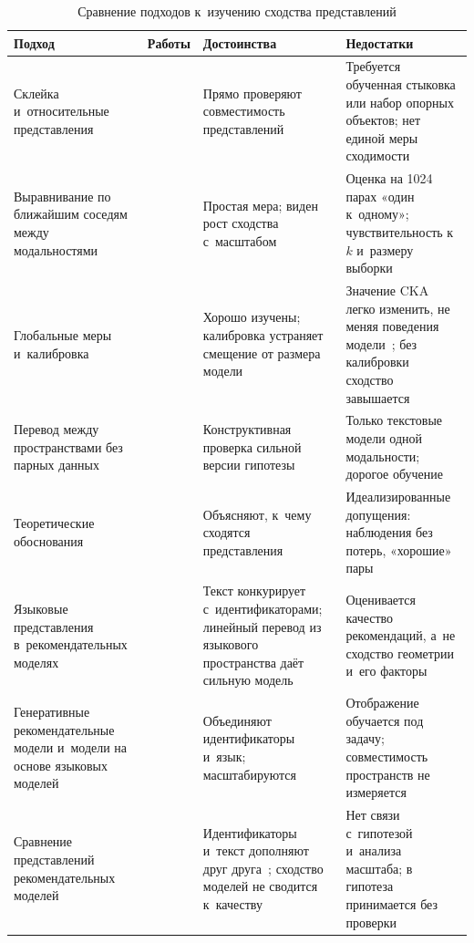 \documentclass[a4paper,12pt]{article}
\begin{document}
\begin{table}[!htbp]
\caption{Сравнение подходов к~изучению сходства представлений}
\label{tab:review}
\small
\renewcommand{\arraystretch}{1.15}
\begin{tabularx}{\textwidth}{@{}P{3.7cm}P{1.6cm}LL@{}}
\toprule
Подход & Работы & Достоинства & Недостатки \\
\midrule
Склейка и~относительные представления
  & \cite{moschella2023relative,bansal2021stitching,dravid2023rosetta,lenc2015equivariance}
  & Прямо проверяют совместимость представлений
  & Требуется обученная стыковка или набор опорных объектов; нет единой меры сходимости \\
\addlinespace[2pt]
Выравнивание по ближайшим соседям между модальностями
  & \cite{huh2024platonic,maniparambil2024,sharma2024checkup,merullo2023linearly}
  & Простая мера; виден рост сходства с~масштабом
  & Оценка на 1024 парах «один к~одному»; чувствительность к~$k$ и~размеру
    выборки~\cite{koepke2026cave} \\
\addlinespace[2pt]
Глобальные меры и~калибровка
  & \cite{groger2026aristotelian,kornblith2019cka,klabunde2025survey,davari2023cka}
  & Хорошо изучены; калибровка устраняет смещение от размера
    модели~\cite{groger2026aristotelian}
  & Значение CKA легко изменить, не меняя поведения модели~\cite{davari2023cka};
    без калибровки сходство завышается \\
\addlinespace[2pt]
Перевод между пространствами без парных данных
  & \cite{jha2025vec2vec}
  & Конструктивная проверка сильной версии гипотезы
  & Только текстовые модели одной модальности; дорогое обучение \\
\addlinespace[2pt]
Теоретические обоснования
  & \cite{huh2024platonic,balestriero2026jepa,oord2018cpc,levy2014implicit}
  & Объясняют, к~чему сходятся представления
  & Идеализированные допущения: наблюдения без потерь, «хорошие» пары \\
\addlinespace[2pt]
Языковые представления в~рекомендательных моделях
  & \cite{hou2022unisrec,li2023recformer,yuan2023idvsmodality,sheng2025alpharec}
  & Текст конкурирует с~идентификаторами; линейный перевод из языкового пространства
    даёт сильную модель~\cite{sheng2025alpharec}
  & Оценивается качество рекомендаций, а~не сходство геометрии и~его факторы \\
\addlinespace[2pt]
Генеративные рекомендательные модели и~модели на основе языковых моделей
  & \cite{zhang2023collm,liao2024llara,zhai2024hstu,rajput2023tiger}
  & Объединяют идентификаторы и~язык; масштабируются~\cite{zhai2024hstu}
  & Отображение обучается под задачу; совместимость пространств не измеряется \\
\addlinespace[2pt]
Сравнение представлений рекомендательных моделей
  & \cite{collins2025complementarity,lin2024dreamumm,iana2024peeling}
  & Идентификаторы и~текст дополняют друг друга~\cite{collins2025complementarity};
    сходство моделей не сводится к~качеству~\cite{iana2024peeling}
  & Нет связи с~гипотезой и~анализа масштаба; в~\cite{lin2024dreamumm} гипотеза
    принимается без проверки \\
\bottomrule
\end{tabularx}
\end{table}
\end{document}
